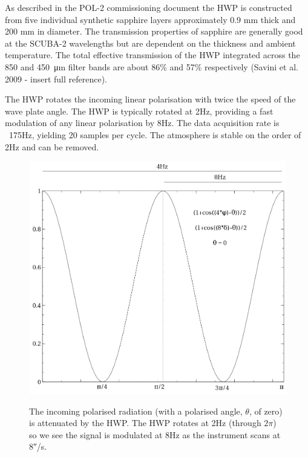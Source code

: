 As described in the POL-2 commissioning document the HWP is
constructed from five individual synthetic sapphire layers
approximately 0.9 mm thick and 200 mm in diameter. The transmission
properties of sapphire are generally good at the SCUBA-2 wavelengths
but are dependent on the thickness and ambient temperature. The total
effective transmission of the HWP integrated across the 850 and
\SI{450}{\micro\metre} filter bands are about 86\% and 57\%
respectively (Savini et al. 2009 - insert full reference).

The HWP rotates the incoming linear polarisation with twice the speed
of the wave plate angle.  The HWP is typically rotated at 2Hz,
providing a fast modulation of any linear polarisation by 8Hz.  The
data acquisition rate is ~175Hz, yielding 20 samples per cycle.  The
atmosphere is stable on the order of 2Hz and can be removed.


\begin{figure}[t!]
\begin{center}
\includegraphics[width=0.7\linewidth]{hwp-modulation.png}
\label{fig:hwpmodulation}
\caption [Attenuation of signal by HWP]{The incoming polarised
  radiation (with a polarised angle, $\theta$, of zero) is attenuated
  by the HWP.  The HWP rotates at 2Hz (through $2\pi$) so we see the
  signal is modulated at 8Hz as the instrument scans at
  8\si{\arcsecond}/s. }
\end{center}
\end{figure}


